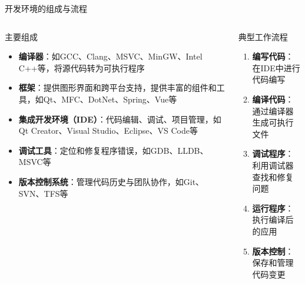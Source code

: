\documentclass[UTF8,aspectratio=169]{beamer}
\begin{document}
\begin{frame}{开发环境的组成与流程}
    \begin{columns}
        \begin{column}{0.58\textwidth}
            \begin{ytublock}{主要组成}
                \begin{itemize}
                    \item \textbf{编译器}：如GCC、Clang、MSVC、MinGW、Intel C++等，将源代码转为可执行程序
                    \item \textbf{框架}：提供图形界面和跨平台支持，提供丰富的组件和工具，如Qt、MFC、DotNet、Spring、Vue等
                    \item \textbf{集成开发环境（IDE）}：代码编辑、调试、项目管理，如Qt Creator、Visual Studio、Eclipse、VS Code等
                    \item \textbf{调试工具}：定位和修复程序错误，如GDB、LLDB、MSVC等
                    \item \textbf{版本控制系统}：管理代码历史与团队协作，如Git、SVN、TFS等
                \end{itemize}
            \end{ytublock}
        \end{column}
        \hspace{0.02\textwidth}
        \begin{column}{0.38\textwidth}
            \begin{ytublock}{典型工作流程}
                \begin{enumerate}
                    \item \textbf{编写代码}：\\ 在IDE中进行代码编写
                    \item \textbf{编译代码}：\\ 通过编译器生成可执行文件
                    \item \textbf{调试程序}：\\ 利用调试器查找和修复问题
                    \item \textbf{运行程序}：\\ 执行编译后的应用
                    \item \textbf{版本控制}：\\ 保存和管理代码变更
                \end{enumerate}
            \end{ytublock}
        \end{column}
    \end{columns}
\end{frame}
\end{document}
